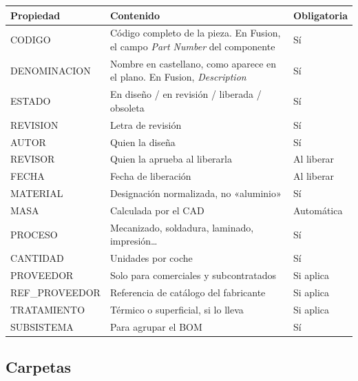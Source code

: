 \begin{center}
\begin{tabularx}{\textwidth}{@{}lXl@{}}
\toprule
\textbf{Propiedad} & \textbf{Contenido} & \textbf{Obligatoria} \\
\midrule
\ttfamily CODIGO        & Código completo de la pieza. En Fusion, el campo
                          \emph{Part Number} del componente & Sí \\
\ttfamily DENOMINACION  & Nombre en castellano, como aparece en el plano.
                          En Fusion, \emph{Description} & Sí \\
\ttfamily ESTADO        & En diseño / en revisión / liberada / obsoleta & Sí \\
\ttfamily REVISION      & Letra de revisión & Sí \\
\ttfamily AUTOR         & Quien la diseña & Sí \\
\ttfamily REVISOR       & Quien la aprueba al liberarla & Al liberar \\
\ttfamily FECHA         & Fecha de liberación & Al liberar \\
\ttfamily MATERIAL      & Designación normalizada, no «aluminio» & Sí \\
\ttfamily MASA          & Calculada por el CAD & Automática \\
\ttfamily PROCESO       & Mecanizado, soldadura, laminado, impresión\ldots & Sí \\
\ttfamily CANTIDAD      & Unidades por coche & Sí \\
\ttfamily PROVEEDOR     & Solo para comerciales y subcontratados & Si aplica \\
\ttfamily REF\_PROVEEDOR & Referencia de catálogo del fabricante & Si aplica \\
\ttfamily TRATAMIENTO   & Térmico o superficial, si lo lleva & Si aplica \\
\ttfamily SUBSISTEMA    & Para agrupar el BOM & Sí \\
\bottomrule
\end{tabularx}
\end{center}

\subsection{Carpetas}

